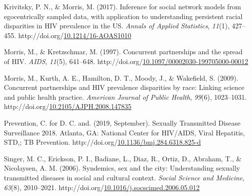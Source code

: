 \documentclass [11pt, proquest] {uwthesis}[2015/03/03]
\newlength{\cslhangindent}
\newenvironment{CSLReferences}%
{\setlength{\parindent}{0pt}%
\everypar{\setlength{\hangindent}{\cslhangindent}}\ignorespaces}%
{\par}
\begin{document}
\begin{CSLReferences}{1}{0}
\leavevmode\hypertarget{ref-Krivitsky2017}{}%
Krivitsky, P. N., \& Morris, M. (2017). {Inference for social network models from egocentrically sampled data, with application to understanding persistent racial disparities in HIV prevalence in the US}. \emph{Annals of Applied Statistics}, \emph{11}(1), 427--455. http://doi.org/\href{https://doi.org/10.1214/16-AOAS1010}{10.1214/16-AOAS1010}

\leavevmode\hypertarget{ref-Morris1997}{}%
Morris, M., \& Kretzschmar, M. (1997). {Concurrent partnerships and the spread of HIV}. \emph{AIDS}, \emph{11}(5), 641--648. http://doi.org/\href{https://doi.org/10.1097/00002030-199705000-00012}{10.1097/00002030-199705000-00012}

\leavevmode\hypertarget{ref-Morris2009}{}%
Morris, M., Kurth, A. E., Hamilton, D. T., Moody, J., \& Wakefield, S. (2009). {Concurrent partnerships and HIV prevalence disparities by race: Linking science and public health practice}. \emph{American Journal of Public Health}, \emph{99}(6), 1023--1031. http://doi.org/\href{https://doi.org/10.2105/AJPH.2008.147835}{10.2105/AJPH.2008.147835}

\leavevmode\hypertarget{ref-CDC2019}{}%
Prevention, C. for D. C. and. (2019, September). {Sexually Transmitted Disease Surveillance 2018}. Atlanta, GA: National Center for HIV/AIDS, Viral Hepatitis, STD,; TB Prevention. http://doi.org/\href{https://doi.org/10.1136/bmj.284.6318.825-d}{10.1136/bmj.284.6318.825-d}

\leavevmode\hypertarget{ref-Singer2006}{}%
Singer, M. C., Erickson, P. I., Badiane, L., Diaz, R., Ortiz, D., Abraham, T., \& Nicolaysen, A. M. (2006). {Syndemics, sex and the city: Understanding sexually transmitted diseases in social and cultural context}. \emph{Social Science and Medicine}, \emph{63}(8), 2010--2021. http://doi.org/\href{https://doi.org/10.1016/j.socscimed.2006.05.012}{10.1016/j.socscimed.2006.05.012}

\end{CSLReferences}
\end{document}
